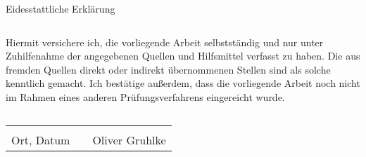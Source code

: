 \thispagestyle{empty}


\begin{LARGE}Eidesstattliche Erklärung\end{LARGE}
\begin{verbatim}

\end{verbatim}

Hiermit versichere ich, die vorliegende Arbeit selbstständig und nur unter Zuhilfenahme
der angegebenen Quellen und Hilfsmittel verfasst zu haben. Die aus fremden Quellen
direkt oder indirekt übernommenen Stellen sind als solche kenntlich gemacht.
Ich bestätige außerdem, dass die vorliegende Arbeit noch nicht im Rahmen eines anderen
Prüfungsverfahrens eingereicht wurde.
\begin{verbatim}

\end{verbatim}

\begin{tabular}{lp{8em}l} 
 \hspace{5cm}   && \hspace{5cm} \\\cline{1-1}\cline{3-3} 
 Ort, Datum     && Oliver Gruhlke 
\end{tabular} 